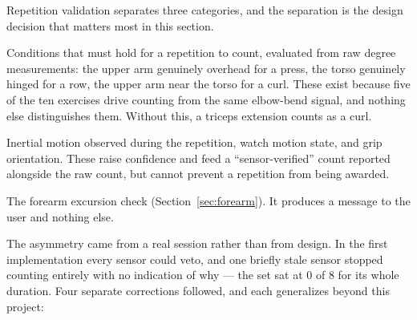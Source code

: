 \documentclass[11pt,a4paper]{article}
\begin{document}
Repetition validation separates three categories, and the separation is the
design decision that matters most in this section.

\begin{description}[leftmargin=1.2cm,style=nextline,itemsep=4pt]
\item[Postural preconditions --- may reject] Conditions that must hold for a
repetition to count, evaluated from raw degree measurements: the upper arm
genuinely overhead for a press, the torso genuinely hinged for a row, the upper
arm near the torso for a curl. These exist because five of the ten exercises
drive counting from the same elbow-bend signal, and nothing else distinguishes
them. Without this, a triceps extension counts as a curl.

\item[Corroboration --- may only strengthen] Inertial motion observed during
the repetition, watch motion state, and grip orientation. These raise
confidence and feed a ``sensor-verified'' count reported alongside the raw
count, but cannot prevent a repetition from being awarded.

\item[Advisory --- may only inform] The forearm excursion check
(Section~\ref{sec:forearm}). It produces a message to the user and nothing else.
\end{description}

The asymmetry came from a real session rather than from design. In the first
implementation every sensor could veto, and one briefly stale sensor stopped
counting entirely with no indication of why --- the set sat at 0 of 8 for its
whole duration. Four separate corrections followed, and each generalizes beyond
this project:
\end{document}
